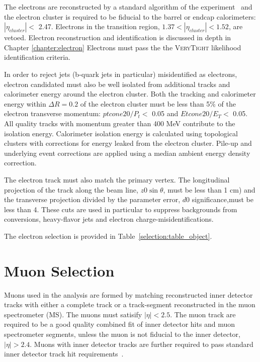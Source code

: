 The electrons are reconstructed by a standard algorithm of the
experiment~\cite{ATLAS-CONF-2014-032} and the electron cluster is required to be fiducial 
to the barrel or endcap calorimeters: $|\eta_{cluster}| < $ 2.47. Electrons
in the transition region, $1.37 < |\eta_{cluster}| < 1.52$, are vetoed.
Electron reconstruction and identification is discussed in depth in Chapter \ref{chapter:electron}
Electrons must pass the the \textsc{VeryTight} likelihood identification criteria.

In order to reject jets (b-quark jets in particular) misidentified as electrons,
electron candidated  must also be well isolated from additional tracks and
calorimeter energy around the electron cluster. Both the tracking 
and calorimeter energy within $\Delta R=0.2$ of the electron
cluster must be less than 5\% of the electron transverse momentum: $ptcone20/P_t <$ 0.05 and $Etcone20/E_T <$ 0.05.
All quality tracks with momentum greater than 400 MeV contribute to the isolation
energy.  Calorimeter isolation energy is calculated
using topological clusters with corrections for energy leaked from the
electron cluster. Pile-up and underlying event corrections are applied using
a median ambient energy density correction.  

The electron track must also match the primary vertex. The longitudinal projection 
of the track along the beam line, $z0\sin{\theta}$, must be less than 1 cm) and the transverse projection divided by the
parameter error, $d0$ significance,must be less than 4. These cuts are used in particular to suppress backgrounds
from conversions, heavy-flavor jets and electron charge-misidentifications. 


The electron selection is provided in Table~\ref{selection:table_object}. 


\section{Muon Selection}

Muons used in the analysis are formed by matching reconstructed inner detector
tracks with either a complete track or a track-segment reconstructed in the muon spectrometer (MS).
The muons must satisify $|\eta| < 2.5$.
The muon track are required to be a good quality combined fit of inner detector hits and muon
spectrometer segments, unless the muon is not fiducial to the
inner detector, $|\eta| > 2.4$.  Muons with inner detector tracks are further required
to pass standard inner detector track hit requirements~\cite{MCP2012}.  

